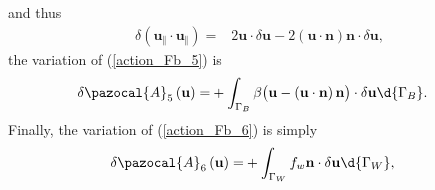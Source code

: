 and thus
\begin{align*}
  \delta \left( \mathbf{u}_{\Vert} \cdot \mathbf{u}_{\Vert} \right) = & 2 \mathbf{u} \cdot \delta \mathbf{u} - 2 \left( \mathbf{u} \cdot \mathbf{n} \right) \mathbf{n} \cdot \delta \mathbf{u},
\end{align*}
the variation of (\ref{action_Fb_5}) is
\begin{align}
  \label{action_variation_Fb_5}
  \delta \pazocal{A}_5 \left(\mathbf{u} \right) = &+ \int_{\Gamma_B} \beta \big( \mathbf{u} - \left( \mathbf{u} \cdot \mathbf{n} \right) \mathbf{n} \big) \cdot \delta \mathbf{u} \d{\Gamma_B}.
\end{align}
Finally, the variation of (\ref{action_Fb_6}) is simply
\begin{align}
  \label{action_variation_Fb_6}
  \delta \pazocal{A}_6 \left(\mathbf{u} \right) = &+ \int_{\Gamma_W} f_w \mathbf{n} \cdot \delta \mathbf{u} \d{\Gamma_W},
\end{align}
 
